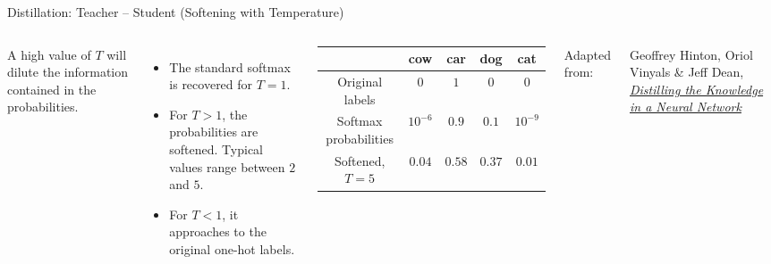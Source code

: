 \begin{frame}{Distillation: Teacher -- Student (Softening with Temperature)}
  \begin{columns}[T,onlytextwidth]
      A high value of $T$ will dilute the information contained in the probabilities.
      \begin{itemize}
        \item The standard softmax is recovered for $T{=}1$.
        \item For $T{>}1$, the probabilities are softened. Typical values range between $2$ and $5$.
        \item For $T{<}1$, it approaches to the original one-hot labels.
      \end{itemize}
 

      \centering
      \setlength{\tabcolsep}{0.25em}
      \renewcommand{\arraystretch}{1.1}
      \begin{tabular}{c|cccc}
        & \footnotesize cow & \footnotesize car & \footnotesize dog & \footnotesize cat \\
        \hline
        \footnotesize Original labels & $0$ & $1$ & $0$ & $0$ \\
        \footnotesize Softmax probabilities & $10^{-6}$ & $0.9$ & $0.1$ & $10^{-9}$ \\
        \footnotesize Softened, $T{=}5$ & $0.04$ & $0.58$ & $0.37$ & $0.01$
      \end{tabular}

      \vspace{0.75em}
      {\footnotesize
        Adapted from:\par
        Geoffrey Hinton, Oriol Vinyals \& Jeff Dean, \href{https://arxiv.org/abs/1503.02531}{\textit{Distilling the Knowledge in a Neural Network}}
      }
  \end{columns}
\end{frame}


